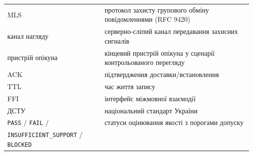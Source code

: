 \begin{longtable}{p{3.2cm} p{11.5cm}}
MLS & протокол захисту групового обміну повідомленнями (RFC 9420) \\
канал нагляду & серверно-сліпий канал передавання захисних сигналів \\
пристрій опікуна & кінцевий пристрій опікуна у сценарії контрольованого перегляду \\
ACK & підтвердження доставки/встановлення \\
TTL & час життя запису \\
FFI & інтерфейс міжмовної взаємодії \\
ДСТУ & національний стандарт України \\
\texttt{PASS} / \texttt{FAIL} / & статуси оцінювання якості з порогами допуску \\
\texttt{INSUFFICIENT\_SUPPORT} / \texttt{BLOCKED} & \\
\end{longtable}
